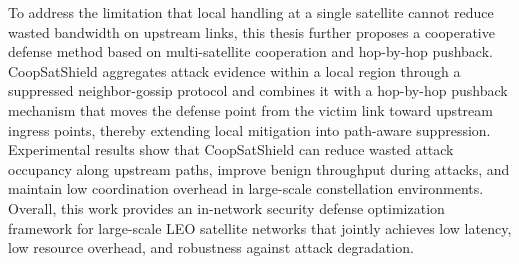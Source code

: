 \documentclass[print, master, vlined]{DissertUESTC}
\begin{document}
	To address the limitation that local handling at a single satellite cannot reduce wasted bandwidth on upstream links, this thesis further proposes a cooperative defense method based on multi-satellite cooperation and hop-by-hop pushback. CoopSatShield aggregates attack evidence within a local region through a suppressed neighbor-gossip protocol and combines it with a hop-by-hop pushback mechanism that moves the defense point from the victim link toward upstream ingress points, thereby extending local mitigation into path-aware suppression. Experimental results show that CoopSatShield can reduce wasted attack occupancy along upstream paths, improve benign throughput during attacks, and maintain low coordination overhead in large-scale constellation environments. Overall, this work provides an in-network security defense optimization framework for large-scale LEO satellite networks that jointly achieves low latency, low resource overhead, and robustness against attack degradation.


	
	\tableofcontents  %
	
	\listoffigures  %
	
	\listoftables  %
%	
		











	\acknowledgement
	

	
	
	

	\achievement
	
	
\end{document}
